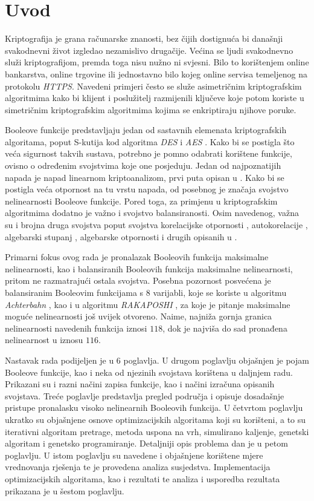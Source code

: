 \chapter{Uvod}
Kriptografija je grana računarske znanosti, bez čijih dostignuća bi današnji svakodnevni život izgledao nezamislivo drugačije.
Većina se ljudi svakodnevno služi kriptografijom, premda toga nisu nužno ni svjesni.
Bilo to korištenjem online bankarstva, online trgovine ili jednostavno bilo kojeg online servisa temeljenog na protokolu \textit{HTTPS}.
Navedeni primjeri često se služe asimetričnim kriptografskim algoritmima kako bi klijent i poslužitelj razmijenili ključeve koje potom koriste u simetričnim kriptografskim algoritmima kojima se enkriptiraju njihove poruke.

Booleove funkcije predstavljaju jedan od sastavnih elemenata kriptografskih algoritama, poput S-kutija kod algoritma \textit{DES} i \textit{AES} \cite{daemen1999aes}.
Kako bi se postigla što veća sigurnost takvih sustava, potrebno je pomno odabrati korištene funkcije, ovisno o određenim svojstvima koje one posjeduju.
Jedan od najpoznatijih napada je napad linearnom kriptoanalizom, prvi puta opisan u \cite{golic1994linear}.
Kako bi se postigla veća otpornost na tu vrstu napada, od posebnog je značaja svojstvo nelinearnosti Booleove funkcije.
Pored toga, za primjenu u kriptografskim algoritmima dodatno je važno i svojstvo balansiranosti.
Osim navedenog, važna su i brojna druga svojstva poput svojstva korelacijske otpornosti , autokorelacije , algebarski stupanj , algebarske otpornosti  i drugih opisanih u \cite{CryptographicBooleanFunctions}.

Primarni fokus ovog rada je pronalazak Booleovih funkcija maksimalne nelinearnosti, kao i balansiranih Booleovih funkcija maksimalne nelinearnosti, pritom ne razmatrajući ostala svojstva.
Posebna pozornost posvećena je balansiranim Booleovim funkcijama s $8$ varijabli, koje se koriste u algoritmu \textit{Achterbahn} \cite{gammel2005achterbahn}, kao i u algoritmu \textit{RAKAPOSHI} \cite{cid2009rakaposhi}, za koje je pitanje maksimalne moguće nelinearnosti još uvijek otvoreno.
Naime, najniža gornja granica nelinearnosti navedenih funkcija iznosi $118$, dok je najviša do sad pronađena nelinearnost u iznosu $116$.

Nastavak rada podijeljen je u $6$ poglavlja.
U drugom poglavlju objašnjen je pojam Booleove funkcije, kao i neka od njezinih svojstava korištena u daljnjem radu.
Prikazani su i razni načini zapisa funkcije, kao i načini izračuna opisanih svojstava.
Treće poglavlje predstavlja pregled područja i opisuje dosadašnje pristupe pronalasku visoko nelinearnih Booleovih funkcija.
U četvrtom poglavlju ukratko su objašnjene osnove optimizacijskih algoritama koji su korišteni, a to su iterativni algoritam pretrage, metoda uspona na vrh, simulirano kaljenje, genetski algoritam i genetsko programiranje.
Detaljniji opis problema dan je u petom poglavlju.
U istom poglavlju su navedene i objašnjene korištene mjere vrednovanja rješenja te je provedena analiza susjedstva.
Implementacija optimizacijskih algoritama, kao i rezultati te analiza i usporedba rezultata prikazana je u šestom poglavlju. 